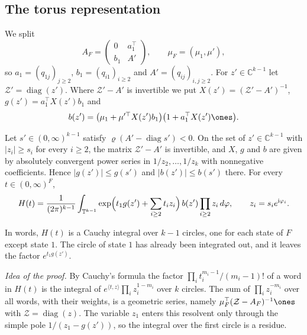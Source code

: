 \subsection{The torus representation}

We split
\[
A_F=\begin{pmatrix}0&a_1^\top\\ b_1&A'\end{pmatrix},\qquad
\mu_F=(\mu_1,\mu'),
\]
so $a_1=(q_{1j})_{j\ge2}$, $b_1=(q_{i1})_{i\ge2}$ and
$A'=(q_{ij})_{i,j\ge2}$. For $z'\in\mathbb C^{k-1}$ let
$\mathcal Z'=\operatorname{diag}(z')$. Where $\mathcal Z'-A'$ is invertible
we put $X(z')=(\mathcal Z'-A')^{-1}$, $g(z')=a_1^\top X(z')b_1$ and
\[
b(z')=\bigl(\mu_1+\mu'^\top X(z')b_1\bigr)\bigl(1+a_1^\top X(z')\ones\bigr).
\]

\begin{lemma}\label{lem:torus}
Let $s'\in(0,\infty)^{k-1}$ satisfy
$\varrho(A'-\operatorname{diag}s')<0$. On the set of $z'\in\mathbb C^{k-1}$
with $|z_i|\ge s_i$ for every $i\ge2$, the matrix
$\mathcal Z'-A'$ is invertible, and $X$, $g$ and $b$ are given by absolutely
convergent power series in $1/z_2,\dots,1/z_k$ with nonnegative coefficients.
Hence $|g(z')|\le g(s')$ and
$|b(z')|\le b(s')$ there. For every $t\in(0,\infty)^F$,
\[
H(t)=\frac1{(2\pi)^{k-1}}\int_{\mathbb T^{k-1}}
\exp\Bigl(t_1g(z')+\sum_{i\ge2}t_iz_i\Bigr)\,b(z')\prod_{i\ge2}z_i\,d\varphi,
\qquad z_i=s_ie^{\mathrm i\varphi_i}.
\]
\end{lemma}

In words, $H(t)$ is a Cauchy integral over $k-1$ circles, one for each state
of $F$ except state $1$. The circle of state $1$ has already been integrated
out, and it leaves the factor $e^{t_1g(z')}$.

\emph{Idea of the proof.} By Cauchy's formula the factor
$\prod_it_i^{m_i-1}/(m_i-1)!$ of a word in $H(t)$ is the integral of
$e^{\langle t,z\rangle}\prod_iz_i^{1-m_i}$ over $k$ circles. The sum of
$\prod_iz_i^{-m_i}$ over all words, with their weights, is a geometric
series, namely $\mu_F^\top(\mathcal Z-A_F)^{-1}\ones$ with
$\mathcal Z=\operatorname{diag}(z)$. The variable $z_1$ enters this resolvent
only through the simple pole $1/(z_1-g(z'))$, so the integral over the first
circle is a residue.

